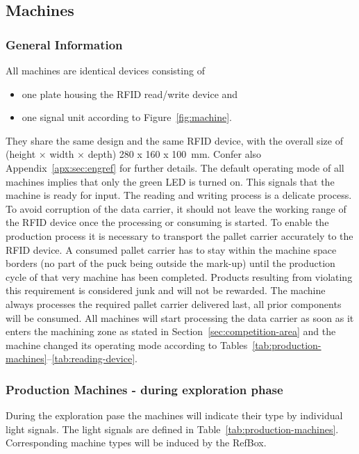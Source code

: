 \documentclass[12pt,twoside]{article}
\begin{document}
\subsection{Machines}
\label{sec:machines}

\subsubsection{General Information}


All machines are identical devices consisting of 
\begin{itemize}
\item one plate housing the RFID read/write device and
\item one signal unit according to Figure~\ref{fig:machine}.
\end{itemize}

They share the same design and the same RFID device, with the overall
size of (height $\times$ width $\times$ depth) \SI{280 x 160 x
  100}{\milli\metre}. Confer also Appendix~\ref{apx:sec:engref} for
  further details. The default operating mode of all machines implies
  that only the green LED is turned on. This signals that the machine
  is ready for input. The reading and writing process is a delicate
  process. To avoid corruption of the data carrier, it should not
  leave the working range of the RFID device once the processing or
  consuming is started. To enable the production process it is
  necessary to transport the pallet carrier accurately to the RFID
  device. A consumed pallet carrier has to stay within the machine
  space borders (no part of the puck being outside the mark-up) until
  the production cycle of that very machine has been
  completed. Products resulting from violating this requirement is
  considered junk and will not be rewarded. The machine always
  processes the required pallet carrier delivered last, all prior
  components will be consumed. All machines will start processing the
  data carrier as soon as it enters the machining zone as stated in
  Section~\ref{sec:competition-area} and the machine changed its
  operating mode according to 
  Tables~\ref{tab:production-machines}--\ref{tab:reading-device}.

\subsubsection{Production Machines - during exploration phase}
During the exploration pase the machines will indicate their type by individual
light signals. The light signals are defined in
Table~\ref{tab:production-machines}. Corresponding machine types will be induced
by the RefBox.
\end{document}
